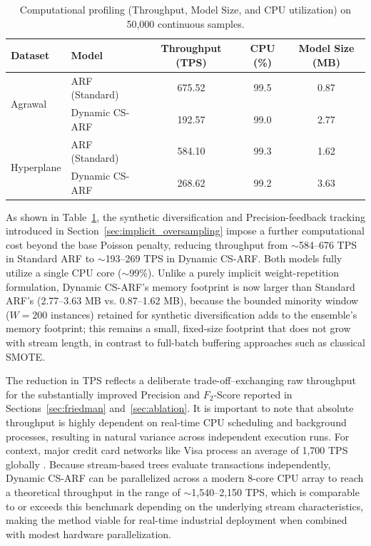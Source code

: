 \documentclass[review,12pt]{elsarticle}
\begin{document}
\begin{table}[htbp]
    \centering
    \caption{Computational profiling (Throughput, Model Size, and CPU utilization) on 50,000 continuous samples.}
    \label{tab:throughput}
    \begin{tabular}{llccc}
        \toprule
        \textbf{Dataset} & \textbf{Model} & \textbf{Throughput (TPS)} & \textbf{CPU (\%)} & \textbf{Model Size (MB)} \\
        \midrule
        \multirow{2}{*}{Agrawal} & ARF (Standard) & 675.52 & 99.5 & 0.87 \\
        & Dynamic CS-ARF & 192.57 & 99.0 & 2.77 \\
        \midrule
        \multirow{2}{*}{Hyperplane} & ARF (Standard) & 584.10 & 99.3 & 1.62 \\
        & Dynamic CS-ARF & 268.62 & 99.2 & 3.63 \\
        \bottomrule
    \end{tabular}
\end{table}

As shown in Table~\ref{tab:throughput}, the synthetic diversification and Precision-feedback tracking introduced in Section~\ref{sec:implicit_oversampling} impose a further computational cost beyond the base Poisson penalty, reducing throughput from $\sim$584--676 TPS in Standard ARF to $\sim$193--269 TPS in Dynamic CS-ARF. Both models fully utilize a single CPU core ($\sim$99\%). Unlike a purely implicit weight-repetition formulation, Dynamic CS-ARF's memory footprint is now larger than Standard ARF's (2.77--3.63 MB vs. 0.87--1.62 MB), because the bounded minority window ($W=200$ instances) retained for synthetic diversification adds to the ensemble's memory footprint; this remains a small, fixed-size footprint that does not grow with stream length, in contrast to full-batch buffering approaches such as classical SMOTE.

The reduction in TPS reflects a deliberate trade-off--exchanging raw throughput for the substantially improved Precision and $F_2$-Score reported in Sections~\ref{sec:friedman} and~\ref{sec:ablation}. It is important to note that absolute throughput is highly dependent on real-time CPU scheduling and background processes, resulting in natural variance across independent execution runs. For context, major credit card networks like Visa process an average of 1,700 TPS globally \cite{visatps}. Because stream-based trees evaluate transactions independently, Dynamic CS-ARF can be parallelized across a modern 8-core CPU array to reach a theoretical throughput in the range of $\sim$1,540--2,150 TPS, which is comparable to or exceeds this benchmark depending on the underlying stream characteristics, making the method viable for real-time industrial deployment when combined with modest hardware parallelization.
\end{document}
